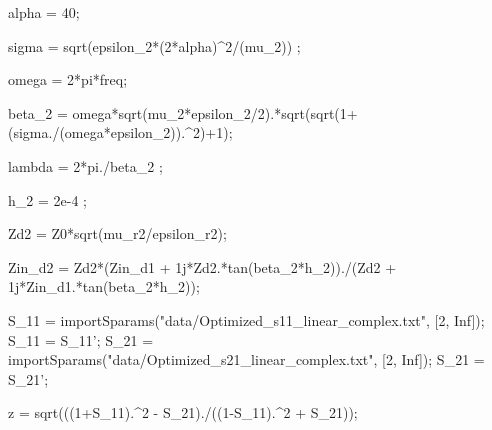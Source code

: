 \begin{matlabcode}
alpha = 40;
\end{matlabcode}



\begin{matlabcode}
sigma = sqrt(epsilon_2*(2*alpha)^2/(mu_2)) ;%
\end{matlabcode}



\begin{matlabcode}
omega = 2*pi*freq;

beta_2 = omega*sqrt(mu_2*epsilon_2/2).*sqrt(sqrt(1+(sigma./(omega*epsilon_2)).^2)+1);

lambda = 2*pi./beta_2 ;%


h_2 = 2e-4 ;%
\end{matlabcode}



\begin{matlabcode}
Zd2 = Z0*sqrt(mu_r2/epsilon_r2);
\end{matlabcode}



\begin{matlabcode}
Zin_d2 = Zd2*(Zin_d1 + 1j*Zd2.*tan(beta_2*h_2))./(Zd2 + 1j*Zin_d1.*tan(beta_2*h_2));
\end{matlabcode}



\begin{matlabcode}
S_11 = importSparams("data/Optimized_s11_linear_complex.txt", [2, Inf]); S_11 = S_11'; 
S_21 = importSparams("data/Optimized_s21_linear_complex.txt", [2, Inf]); S_21 = S_21';

z = sqrt(((1+S_11).^2 - S_21)./((1-S_11).^2 + S_21));
\end{matlabcode}


